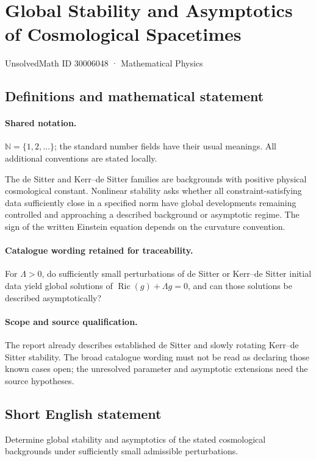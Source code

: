 \documentclass[11pt]{article}
\begin{document}
\setcounter{section}{30006047}
\section{Global Stability and Asymptotics of Cosmological Spacetimes}\label{30006048}
{\small UnsolvedMath ID 30006048 · Mathematical Physics}
\subsection{Definitions and mathematical statement}

\paragraph{Shared notation.}$\mathbb N=\{1,2,\ldots\}$; the standard number fields have their usual meanings. All additional conventions are stated locally.


The de Sitter and Kerr--de Sitter families are backgrounds with positive physical cosmological constant. Nonlinear stability asks whether all constraint-satisfying data sufficiently close in a specified norm have global developments remaining controlled and approaching a described background or asymptotic regime. The sign of the written Einstein equation depends on the curvature convention.

\paragraph{Catalogue wording retained for traceability.}
For $\Lambda>0$, do sufficiently small perturbations of de Sitter or Kerr–de Sitter initial data yield global solutions of $\operatorname{Ric}(g)+\Lambda g=0$, and can those solutions be described asymptotically?

\paragraph{Scope and source qualification.}The report already describes established de Sitter and slowly rotating Kerr--de Sitter stability. The broad catalogue wording must not be read as declaring those known cases open; the unresolved parameter and asymptotic extensions need the source hypotheses.
\subsection{Short English statement}
Determine global stability and asymptotics of the stated cosmological backgrounds under sufficiently small admissible perturbations.
\end{document}
